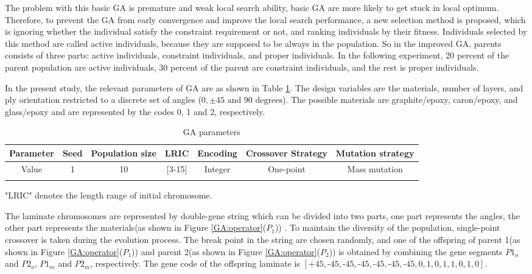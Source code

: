 \documentclass[Afour,sagev,times]{sagej}
\begin{document}
The problem with this basic GA is premature and weak local search ability, basic GA are more likely to get stuck in local
optimum. Therefore, to prevent the GA from early convergence and improve the local search
performance, a new selection method is proposed, which is ignoring whether the individual satisfy
the constraint requirement or not, and ranking individuals by their fitness. Individuals selected by
this method are called active individuals, because they are supposed to be always in the population.
So in the improved GA, parents consists of three parts: active individuals, constraint
individuals, and proper individuals. In the following experiment, 20 percent of the parent
population are active individuals, 30 percent of the parent are constraint individuals, and the rest
is proper individuals.


In the present study, the relevant parameters of GA are as shown in Table \ref{tab:ga}. The design
variables are the materials, number of layers, and ply orientation restricted to a discrete set of
angles ($0,\pm 45 \text{ and } 90 \text{ degrees} $). The possible materials are graphite/epoxy,
caron/epoxy, and glass/epoxy and are represented by the codes 0, 1 and 2, respectively.

\begin{table}
\small\sf\centering
\caption{GA parameters}
\begin{tabular}{ccccccc}
	\toprule
	Parameter &  Seed &Population size & LRIC  & Encoding &  Crossover Strategy& Mutation strategy\\
	\midrule
	Value     & 1     &10               & [3-15]& Integer  &  One-point &Mass mutation   \\
	\bottomrule
	\label{tab:ga}
\end{tabular}
\end{table}
\begin{tablenotes}\footnotesize
\item{"LRIC" denotes the length range of initial chromosome.}
\end{tablenotes}


The laminate chromosomes are represented by double-gene string
which can be divided into two parts, one part represents the angles, the other
part represents the materials(as shown in Figure \ref{GA:operator}($P_1$)) . To maintain
the diversity of the population, single-point crossover is taken during the
evolution process. The break point in the string are chosen randomly, and one of the offspring of parent 1(as shown in Figure
\ref{GA:operator}($P_1$))  and parent 2(as shown in Figure \ref{GA:operator}($P_2$)) is obtained by combining the
gene segments $P1_o$ and $P2_o$, $P1_m$ and $P2_m$, respectively. The gene code of the offspring
laminate is
$[\text{+}45,\text{-}45,\text{-}45,\text{-}45,\text{-}45,\text{-}45,\text{-}45,0,1,0,1,1,0,1,0]$.
\end{document}
